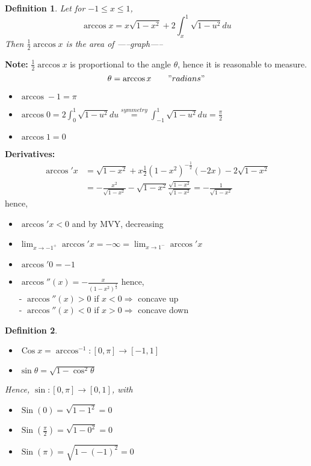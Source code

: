 \documentclass[12pt]{article}
\theoremstyle{plain}
\newtheorem{definition}{Definition}[subsection]
\DeclareMathOperator{\Sin}{Sin}
\DeclareMathOperator{\Cos}{Cos}
\begin{document}
	\begin{definition}
		Let for $-1\leq x\leq 1$, 
		\[
			\arccos x = x \sqrt{1-x^2} + 2\int_x^1 \sqrt{1-u^2} du
		\]
		Then $\frac12 \arccos x$ is the area of 
		-----graph-----
	\end{definition}

	\textbf{Note:} $\frac12\arccos x$ is proportional to the angle $\theta$,
	hence it is reasonable to measure. 
	\[
		\theta = \arccos x \qquad "radians"
	\]
	\begin{itemize}
		\item $\arccos -1 = \pi$
		\item $\arccos 0 = 2\int_0^1 \sqrt{1-u^2} du \overset{symmetry}{=}
			\int_{-1}^1 \sqrt{1-u^2} du = \frac{\pi}2$
		\item $\arccos 1 = 0$
	\end{itemize}
	
	\textbf{Derivatives:}
	\begin{align*}
		\arccos ' x 
		&= \sqrt{1-x^2} + x\frac12(1-x^2)^{-\frac 12} (-2x) - 2\sqrt{1-x^2}\\
		&= -\frac{x^2}{\sqrt{1-x^2}}-\sqrt{1-x^2}\frac{\sqrt{1-x^2}}
			{\sqrt{1-x^2}} = -\frac{1}{\sqrt{1-x^2}}
	\end{align*}
	hence, 
	\begin{itemize}
		\item $\arccos 'x < 0$ and by MVY, decreasing
		\item $\lim_{x\to -1^+} \arccos 'x = -\infty = \lim_{x\to 1^-}
			\arccos 'x$ 
		\item $\arccos '0=-1$
		\item $\arccos ''(x) = -\frac x{(1-x^2)^{\frac 32}}$ hence, \\
			- $\arccos ''(x) > 0$ if $x <0  \Rightarrow $ concave up\\
			- $\arccos ''(x) <0$ if $x > 0 \Rightarrow$ concave down\\
	\end{itemize}

	\begin{definition}
		$ $
		\begin{itemize}
			\item $\Cos x = \arccos ^{-1} : [0,\pi] \to [-1,1]$

			\item $\sin \theta = \sqrt{1-\cos^2 \theta}$
		\end{itemize}
				
		Hence, $\sin:[0,\pi] \to [0,1]$, with 
		\begin{itemize}
			\item $\Sin(0) = \sqrt{1-1^2} = 0$
			\item $\Sin(\frac{\pi}2) = \sqrt{1-0^2} = 0$
			\item $\Sin(\pi) = \sqrt{1-(-1)^2} = 0$
		\end{itemize}
	\end{definition}
\end{document}
